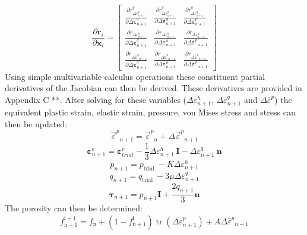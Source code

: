\documentclass[sn-mathphys,Numbered,draft]{sn-jnl}%
\begin{document}
\begin{equation}
\frac{\partial \boldsymbol{r}_i}{\partial \boldsymbol{x}_i}=\left[\begin{array}{ccc}
\frac{\partial r_{\Delta \varepsilon_{n+1}^q}^q}{\partial \Delta \boldsymbol{\varepsilon}_{n+1}^q} & \frac{\partial r_{\Delta \varepsilon_{n+1}^q}^q}{\partial \Delta \boldsymbol{\varepsilon}_{n+1}^h} & \frac{\partial r_{\Delta \varepsilon_{n+1}^q}^q}{\partial \Delta \overline{\boldsymbol{\varepsilon}}^p_{n+1}} \\
\frac{\partial r_{\Delta \varepsilon_{n+1}^h}}{\partial \Delta \boldsymbol{\varepsilon}_{n+1}^q} & \frac{\partial r_{\Delta \varepsilon_{n+1}^h}}{\partial \Delta \boldsymbol{\varepsilon}_{n+1}^h} & \frac{\partial r_{\Delta \varepsilon_{n+1}^h}}{\partial \Delta \overline{\boldsymbol{\varepsilon}}^p{ }_{n+1}} \\
\frac{\partial r_{\Delta \overline{\boldsymbol{\varepsilon}}^p{ }_{n+1}}}{\partial \Delta \boldsymbol{\varepsilon}_{n+1}^q} & \frac{\partial r_{\Delta \overline{\boldsymbol{\varepsilon}}^p{ }_{n+1}}}{\partial \Delta \boldsymbol{\varepsilon}_{n+1}^h} & \frac{\partial r_{\Delta \overline{\boldsymbol{\varepsilon}}^p{ }_{n+1}}}{\partial \Delta \overline{\boldsymbol{\varepsilon}}^p{ }_{n+1}}
\end{array}\right]
\end{equation}
Using simple multivariable calculus operations these constituent partial derivatives of the Jacobian can then be derived. These derivatives are provided in Appendix C **. 
After solving for these variables
($\Delta {\varepsilon}_{n+1}^h$, $\Delta {\varepsilon}_{n+1}^q$ and $\Delta \overline{{\varepsilon}}^p$) the equivalent plastic strain, elastic strain, pressure, von Mises stress and stress can then be updated:
\begin{equation}
\vec{\varepsilon}^p{ }_{n+1}=\vec{\varepsilon}^p{ }_n+\Delta \vec{\varepsilon}^p{ }_{n+1} 
\end{equation}
\begin{equation}
\boldsymbol{\varepsilon}^{e}_{n+1}=\boldsymbol{\varepsilon}^{e}_{trial}-\frac{1}{3}\Delta {\varepsilon}_{n+1}^h\ \mathbf{I}-\Delta {\varepsilon}_{n+1}^q\ \mathbf{n}
\end{equation}
\begin{equation}
p_{n+1}=p_{\text {trial }}-K \Delta \varepsilon_{n+1}^h 
\end{equation}
\begin{equation}
q_{n+1}=q_{\text {trial }}-3 \mu \Delta \varepsilon_{n+1}^q 
\end{equation}
\begin{equation}
\boldsymbol{\tau}_{n+1}=p_{n+1} \boldsymbol{I}+\frac{2q_{n+1}}{3} \boldsymbol{n} 
\end{equation}
The porosity can then be determined:
\begin{equation}
f_{\mathrm{n}+1}^{\mathrm{i}+1}=f_{\mathrm{n}}+\left(1-f_{\mathrm{n}+1}^{\mathrm{i}}\right) \operatorname{tr}\left(\Delta \varepsilon_{n+1}^p\right)+A \Delta \bar{\varepsilon}^p{ }_{n+1}
\end{equation}
\end{document}
